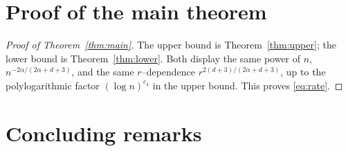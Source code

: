 \documentclass[11pt]{article}
\newcommand{\1}{\mathbf{1}}
\begin{document}
\section{Proof of the main theorem}

\begin{proof}[Proof of Theorem~\ref{thm:main}]
The upper bound is Theorem~\ref{thm:upper}; the lower bound is
Theorem~\ref{thm:lower}. Both display the same power of $n$,
$n^{-2\alpha/(2\alpha+d+3)}$, and the same $r$--dependence
$r^{2(d+3)/(2\alpha+d+3)}$, up to the polylogarithmic factor $(\log n)^{c_4}$ in the
upper bound. This proves \eqref{eq:rate}.
\end{proof}

\section{Concluding remarks}
\end{document}
